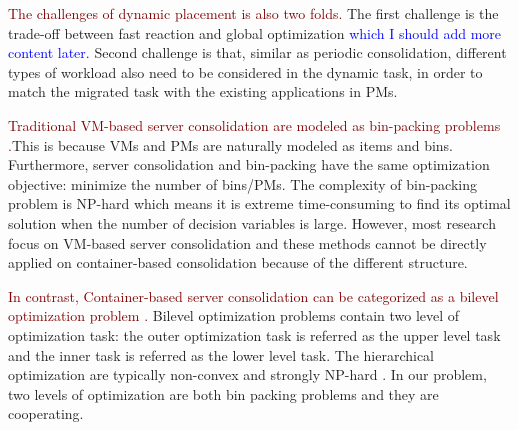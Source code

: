 \textcolor{Maroon}{The challenges of dynamic placement is also two folds.} The first challenge is the trade-off between fast reaction and global optimization \textcolor{blue}{which I should add more content later.} Second challenge is that, similar as periodic consolidation, different types of workload also need to be considered in the dynamic task, in order to match the migrated task with the existing applications in PMs. 


\textcolor{Maroon}{Traditional VM-based server consolidation are modeled as bin-packing problems \cite{Mann:2015ua}.}This is because VMs and PMs are naturally modeled as items and bins. Furthermore, server consolidation and bin-packing have the same optimization objective: minimize the number of bins/PMs. The complexity of bin-packing problem is NP-hard which means it is extreme time-consuming to find its optimal solution when the number of decision variables is large. However,  most research focus on VM-based server consolidation and these methods cannot be directly applied on container-based consolidation because of the different structure.

\textcolor{Maroon}{In contrast, Container-based server consolidation can be categorized as a bilevel optimization problem \cite{Colson:2007bu}.} Bilevel optimization problems contain two level of optimization task: the outer optimization task is referred as the upper level task and the inner task is referred as the lower level task. The hierarchical optimization are typically non-convex and strongly NP-hard \cite{Vicente:1994ie}. In our problem, two levels of optimization are both bin packing problems and they are cooperating.

